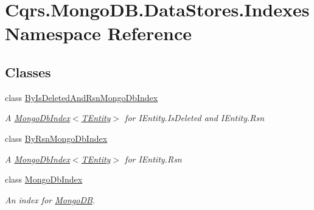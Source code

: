 \hypertarget{namespaceCqrs_1_1MongoDB_1_1DataStores_1_1Indexes}{}\section{Cqrs.\+Mongo\+D\+B.\+Data\+Stores.\+Indexes Namespace Reference}
\label{namespaceCqrs_1_1MongoDB_1_1DataStores_1_1Indexes}
\subsection*{Classes}
\begin{DoxyCompactItemize}
\item 
class \hyperlink{classCqrs_1_1MongoDB_1_1DataStores_1_1Indexes_1_1ByIsDeletedAndRsnMongoDbIndex}{By\+Is\+Deleted\+And\+Rsn\+Mongo\+Db\+Index}
\begin{DoxyCompactList}\small\item\em A \hyperlink{classCqrs_1_1MongoDB_1_1DataStores_1_1Indexes_1_1MongoDbIndex_a61f4b17dd968f92e81562c70ae062a89_a61f4b17dd968f92e81562c70ae062a89}{Mongo\+Db\+Index$<$\+T\+Entity$>$} for I\+Entity.\+Is\+Deleted and I\+Entity.\+Rsn \end{DoxyCompactList}\item 
class \hyperlink{classCqrs_1_1MongoDB_1_1DataStores_1_1Indexes_1_1ByRsnMongoDbIndex}{By\+Rsn\+Mongo\+Db\+Index}
\begin{DoxyCompactList}\small\item\em A \hyperlink{classCqrs_1_1MongoDB_1_1DataStores_1_1Indexes_1_1MongoDbIndex_a61f4b17dd968f92e81562c70ae062a89_a61f4b17dd968f92e81562c70ae062a89}{Mongo\+Db\+Index$<$\+T\+Entity$>$} for I\+Entity.\+Rsn \end{DoxyCompactList}\item 
class \hyperlink{classCqrs_1_1MongoDB_1_1DataStores_1_1Indexes_1_1MongoDbIndex}{Mongo\+Db\+Index}
\begin{DoxyCompactList}\small\item\em An index for \hyperlink{namespaceCqrs_1_1MongoDB}{Mongo\+DB}. \end{DoxyCompactList}\end{DoxyCompactItemize}

